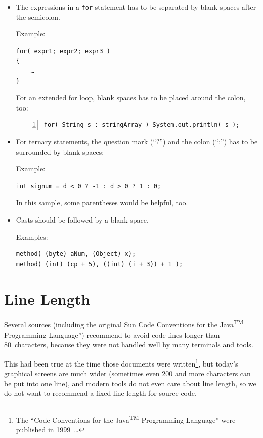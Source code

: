 \documentclass[11pt,a4paper, titlepage, parskip=half, headsepline, footsepline, cleardoublepage=current, headheight=1cm]{scrbook}
\begin{document}
\begin{itemize}
{Example:
\begin{lstlisting}[numbers=left]
a += c + d;
a = (a + b) / (c * d);

while( d-- > s++ )
{
    ++n;
}

printSize( "size is " + foo + "\n" );
\end{lstlisting}}
\item{The expressions in a \lstinline|for| statement has to be separated by blank spaces after the semicolon.

Example:
\begin{lstlisting}
for( expr1; expr2; expr3 )
{
    …
}
\end{lstlisting}

For an extended for loop, blank spaces has to be placed around the colon, too:
\begin{lstlisting}[numbers=left]
for( String s : stringArray ) System.out.println( s );
\end{lstlisting}}
\item{For ternary statements, the question mark (“?”) and the colon (“:”) has to be surrounded by blank spaces:

Example:
\begin{lstlisting}
int signum = d < 0 ? -1 : d > 0 ? 1 : 0;
\end{lstlisting}

In this sample, some parentheses would be helpful, too.}
\item{Casts should be followed by a blank space. 

Examples:
\begin{lstlisting}
method( (byte) aNum, (Object) x);
method( (int) (cp + 5), ((int) (i + 3)) + 1 );
\end{lstlisting}}
\end{itemize}


\section{Line Length}\label{sec:LineLength}
Several sources (including the original Sun Code Conventions for the Java\textsuperscript{TM} Programming Language”\autocite{SUN_CODE_CONVENTIONS:LineLength}) recommend to avoid code lines longer than 80~characters, because they were not handled well by many terminals and tools.

This had been true at the time those documents were written\footnote{The “Code Conventions for the Java\textsuperscript{TM} Programming Language”\autocite{SUN_CODE_CONVENTIONS} were published in 1999~…}, but today's  graphical screens are much wider (sometimes even 200 and more characters can be put into one line), and modern tools do not even care about line length, so we do not want to recommend a fixed line length for source code.
\end{document}
